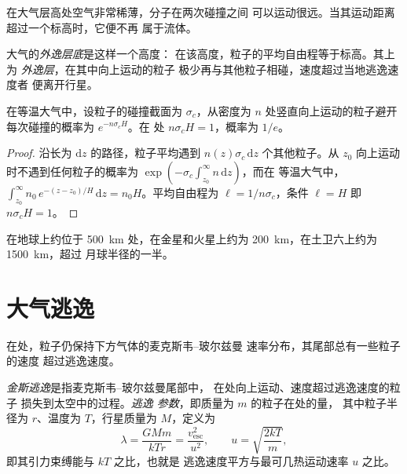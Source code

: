 在大气层高处空气非常稀薄，分子在两次碰撞之间
可以运动很远。当其运动距离超过一个标高时，它便不再
属于流体。

\begin{definition}\label{def:b3:planetary-atmospheres:exobase}
大气的\emph{外逸层底}是这样一个高度：
在该高度，粒子的平均自由程等于标高。其上为
\emph{外逸层}，在其中向上运动的粒子
极少再与其他粒子相碰，速度超过当地逃逸速度者
便离开行星。
\end{definition}

\begin{proposition}[外逸层底条件]\label{prop:b3:planetary-atmospheres:exobase}
在等温大气中，设粒子的碰撞截面为
$\sigma_c$，从密度为
$n$ 处竖直向上运动的粒子避开每次碰撞的概率为 $e^{-n\sigma_c H}$。在
处 $n\sigma_c H = 1$，概率为 $1/e$。
\end{proposition}

\begin{proof}
沿长为 $\mathrm dz$ 的路径，粒子平均遇到 $n(z)\sigma_c\,
\mathrm dz$ 个其他粒子。从
$z_0$ 向上运动时不遇到任何粒子的概率为 $\exp(-\sigma_c\int_{z_0}^\infty n\,\mathrm dz)$，而在
等温大气中，$\int_{z_0}^\infty n_0\,e^{-(z-z_0)/H}\,\mathrm dz
= n_0 H$。平均自由程为 $\ell = 1/n\sigma_c$，条件 $\ell
= H$ 即 $n\sigma_c H = 1$。
\end{proof}

在地球上约位于 \qty{500}{km} 处，在金星和火星上约为
\qty{200}{km}，在土卫六上约为 \qty{1500}{km}，超过
月球半径的一半。

\section{大气逃逸}\label{sec:b3:planetary-atmospheres:escape}

在处，粒子仍保持下方气体的麦克斯韦–玻尔兹曼
速率分布，其尾部总有一些粒子的速度
超过逃逸速度。

\begin{definition}\label{def:b3:planetary-atmospheres:jeans-escape}
\emph{金斯逃逸}是指麦克斯韦–玻尔兹曼尾部中，
在处向上运动、速度超过逃逸速度的粒子
损失到太空中的过程。\emph{逃逸
参数}，即质量为 $m$ 的粒子在处的量，
其中粒子半径为 $r$、温度为 $T$，行星质量为 $M$，定义为
\[
\lambda = \frac{GMm}{kTr} = \frac{v_\mathrm{esc}^2}{u^2},
\qquad u = \sqrt{\frac{2kT}m},
\]
即其引力束缚能与 $kT$ 之比，也就是
逃逸速度平方与最可几热运动速率 $u$ 之比。
\end{definition}

